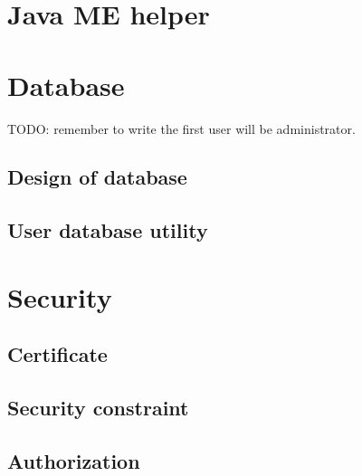 \section{Java ME helper}
\label{sec:WebApplication:JavaMEHelper}

\section{Database}
\label{sec:WebApplication:Database}

\textsf{TODO: remember to write the first user will be administrator.}


\subsection{Design of database}
\label{sec:WebApplication:Database:DesignOfDatabase}

\subsection{User database utility}
\label{sec:WebApplication:Database:UserDatabaseUtility}

\section{Security}
\label{sec:WebApplication:Security}

\subsection{Certificate}
\label{sec:WebApplication:Security:Certificate}

\subsection{Security constraint}
\label{sec:WebApplication:Security:SecurityConstraint}

\subsection{Authorization}
\label{sec:WebApplication:Authorization}

